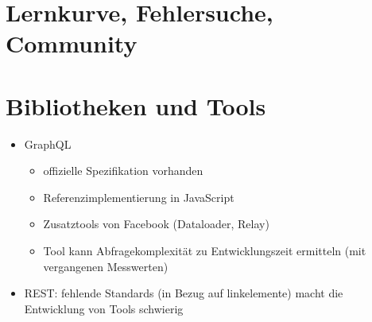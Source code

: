 \section{Lernkurve, Fehlersuche, Community}

\section{Bibliotheken und Tools}
\begin{itemize}
  \item GraphQL
  \begin{itemize}
    \item offizielle Spezifikation vorhanden
    \item Referenzimplementierung in JavaScript
    \item Zusatztools von Facebook (Dataloader, Relay)
    \item Tool kann Abfragekomplexität zu Entwicklungszeit ermitteln (mit vergangenen Messwerten)
  \end{itemize}
  \item REST: fehlende Standards (in Bezug auf linkelemente) macht die Entwicklung von Tools schwierig
\end{itemize}
